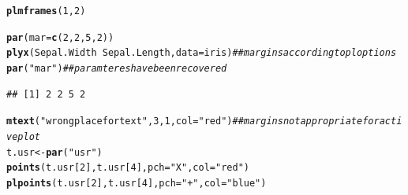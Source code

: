 \documentclass[11pt]{article}\usepackage[]{graphicx}\usepackage[]{color}
\makeatletter
\newcommand{\hlnum}[1]{\textcolor[rgb]{0.686,0.059,0.569}{#1}}%
\newcommand{\hlstr}[1]{\textcolor[rgb]{0.192,0.494,0.8}{#1}}%
\newcommand{\hlcom}[1]{\textcolor[rgb]{0.678,0.584,0.686}{\textit{#1}}}%
\newcommand{\hlopt}[1]{\textcolor[rgb]{0,0,0}{#1}}%
\newcommand{\hlstd}[1]{\textcolor[rgb]{0.345,0.345,0.345}{#1}}%
\newcommand{\hlkwb}[1]{\textcolor[rgb]{0.69,0.353,0.396}{#1}}%
\newcommand{\hlkwc}[1]{\textcolor[rgb]{0.333,0.667,0.333}{#1}}%
\newcommand{\hlkwd}[1]{\textcolor[rgb]{0.737,0.353,0.396}{\textbf{#1}}}%
\newenvironment{kframe}{%
 \def\at@end@of@kframe{}%
 \ifinner\ifhmode%
  \def\at@end@of@kframe{\end{minipage}}%
  \begin{minipage}{\columnwidth}%
 \fi\fi%
 \def\FrameCommand##1{\hskip\@totalleftmargin \hskip-\fboxsep
 \colorbox{shadecolor}{##1}\hskip-\fboxsep
     \hskip-\linewidth \hskip-\@totalleftmargin \hskip\columnwidth}%
 \MakeFramed {\advance\hsize-\width
   \@totalleftmargin\z@ \linewidth\hsize
   \@setminipage}}%
 {\par\unskip\endMakeFramed%
 \at@end@of@kframe}
\newenvironment{knitrout}{}{} %
\makeatother
\begin{document}
\begin{knitrout}
\color{fgcolor}\begin{kframe}
\begin{alltt}
\hlkwd{plmframes}\hlstd{(}\hlnum{1}\hlstd{,}\hlnum{2}\hlstd{)}

\hlkwd{par}\hlstd{(}\hlkwc{mar}\hlstd{=}\hlkwd{c}\hlstd{(}\hlnum{2}\hlstd{,}\hlnum{2}\hlstd{,}\hlnum{5}\hlstd{,}\hlnum{2}\hlstd{))}
\hlkwd{plyx}\hlstd{(Sepal.Width}\hlopt{~}\hlstd{Sepal.Length,} \hlkwc{data}\hlstd{=iris)} \hlcom{## margins according to ploptions}
\hlkwd{par}\hlstd{(}\hlstr{"mar"}\hlstd{)} \hlcom{## paramteres have been recovered}
\end{alltt}
\begin{verbatim}
## [1] 2 2 5 2
\end{verbatim}
\begin{alltt}
\hlkwd{mtext}\hlstd{(}\hlstr{"wrong place for text"}\hlstd{,}\hlnum{3}\hlstd{,}\hlnum{1}\hlstd{,} \hlkwc{col}\hlstd{=}\hlstr{"red"}\hlstd{)}  \hlcom{## margins not appropriate for active plot}
\hlstd{t.usr} \hlkwb{<-} \hlkwd{par}\hlstd{(}\hlstr{"usr"}\hlstd{)}
\hlkwd{points}\hlstd{(t.usr[}\hlnum{2}\hlstd{],t.usr[}\hlnum{4}\hlstd{],} \hlkwc{pch}\hlstd{=}\hlstr{"X"}\hlstd{,} \hlkwc{col}\hlstd{=}\hlstr{"red"}\hlstd{)}
\hlkwd{plpoints}\hlstd{(t.usr[}\hlnum{2}\hlstd{],t.usr[}\hlnum{4}\hlstd{],} \hlkwc{pch}\hlstd{=}\hlstr{"+"}\hlstd{,} \hlkwc{col}\hlstd{=}\hlstr{"blue"}\hlstd{)}


\end{alltt}
\end{kframe}
\end{knitrout}
\end{document}
